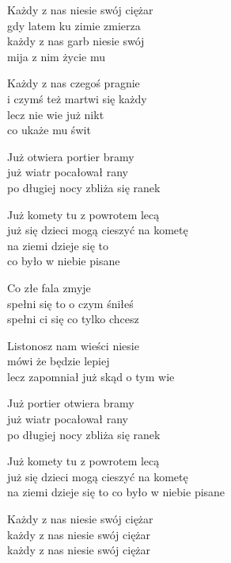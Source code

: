 \begin{text}
    Każdy z nas niesie swój ciężar\\
    gdy latem ku zimie zmierza\\
    każdy z nas garb niesie swój\\
    mija z nim życie mu

    Każdy z nas czegoś pragnie\\
    i czymś też martwi się każdy\\
    lecz nie wie już nikt\\
    co ukaże mu świt

    Już otwiera portier bramy\\
    już wiatr pocałował rany\\
    po długiej nocy zbliża się ranek

    Już komety tu z powrotem lecą\\
    już się dzieci mogą cieszyć na kometę\\
    na ziemi dzieje się to\\
    co było w niebie pisane

    Co złe fala zmyje\\
    spełni się to o czym śniłeś\\
    spełni ci się co tylko chcesz

    Listonosz nam wieści niesie\\
    mówi że będzie lepiej\\
    lecz zapomniał już skąd o tym wie

    Już portier otwiera bramy\\
    już wiatr pocałował rany\\
    po długiej nocy zbliża się ranek

    Już komety tu z powrotem lecą\\
    już się dzieci mogą cieszyć na kometę\\
    na ziemi dzieje się to co było w niebie pisane

    Każdy z nas niesie swój ciężar\\
    każdy z nas niesie swój ciężar\\
    każdy z nas niesie swój ciężar
\end{text}
\begin{chord}

\end{chord}